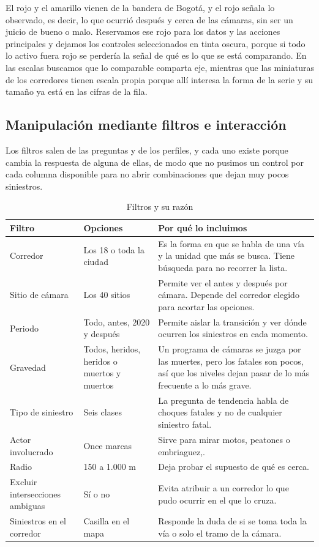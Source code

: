 \documentclass[10pt,a4paper]{article}
\begin{document}
El rojo y el amarillo vienen de la bandera de Bogotá, y el rojo señala lo observado, es decir, lo que ocurrió después y cerca de las cámaras, sin ser un juicio de bueno o malo. Reservamos ese rojo para los datos y las acciones principales y dejamos los controles seleccionados en tinta oscura, porque si todo lo activo fuera rojo se perdería la señal de qué es lo que se está comparando. En las escalas buscamos que lo comparable comparta eje, mientras que las miniaturas de los corredores tienen escala propia porque allí interesa la forma de la serie y su tamaño ya está en las cifras de la fila.

\subsection{Manipulación mediante filtros e interacción}

Los filtros salen de las preguntas y de los perfiles, y cada uno existe porque cambia la respuesta de alguna de ellas, de modo que no pusimos un control por cada columna disponible para no abrir combinaciones que dejan muy pocos siniestros.

\begin{table}[!htbp]\centering\small
\begin{tabularx}{\linewidth}{P{3.3cm}P{4.2cm}L}
\toprule
\textbf{Filtro} & \textbf{Opciones} & \textbf{Por qué lo incluimos}\\
\midrule
Corredor & Los 18 o toda la ciudad & Es la forma en que se habla de una vía y la unidad que más se busca. Tiene búsqueda para no recorrer la lista.\\
Sitio de cámara & Los 40 sitios & Permite ver el antes y después por cámara. Depende del corredor elegido para acortar las opciones.\\
Periodo & Todo, antes, 2020 y después & Permite aislar la transición y ver dónde ocurren los siniestros en cada momento.\\
Gravedad & Todos, heridos, heridos o muertos y muertos & Un programa de cámaras se juzga por las muertes, pero los fatales son pocos, así que los niveles dejan pasar de lo más frecuente a lo más grave.\\
Tipo de siniestro & Seis clases & La pregunta de tendencia habla de choques fatales y no de cualquier siniestro fatal.\\
Actor involucrado & Once marcas & Sirve para mirar motos, peatones o embriaguez,.\\
Radio & 150 a 1.000 m & Deja probar el supuesto de qué es cerca.\\
Excluir intersecciones ambiguas & Sí o no & Evita atribuir a un corredor lo que pudo ocurrir en el que lo cruza.\\
Siniestros en el corredor & Casilla en el mapa & Responde la duda de si se toma toda la vía o solo el tramo de la cámara.\\
\bottomrule
\end{tabularx}
\caption{Filtros y su razón}
\end{table}
\end{document}
